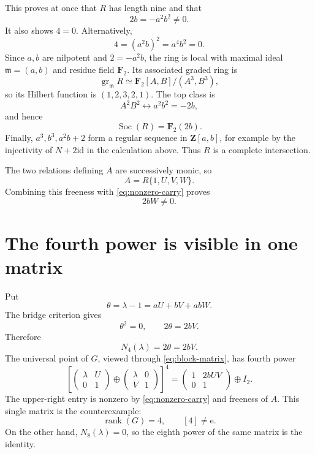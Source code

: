 \documentclass[11pt]{amsart}
\theoremstyle{definition}
\theoremstyle{remark}
\newcommand{\Z}{\mathbf Z}
\newcommand{\F}{\mathbf F}
\newcommand{\Soc}{\operatorname{Soc}}
\newcommand{\gr}{\operatorname{gr}}
\newcommand{\m}{\mathfrak m}
\newcommand{\id}{\mathrm{id}}
\newcommand{\unit}{\mathrm e}
\begin{document}
This proves at once that \(R\) has length nine and that
\begin{equation}\label{eq:nonzero-carry}
 2b=-a^2b^2\ne0.
\end{equation}
It also shows \(4=0\).  Alternatively,
\[
 4=(a^2b)^2=a^4b^2=0.
\]
Since \(a,b\) are nilpotent and \(2=-a^2b\), the ring is local with
maximal ideal \(\m=(a,b)\) and residue field \(\F_2\).  Its associated
graded ring is
\[
 \gr_{\m}R\simeq\F_2[A,B]/(A^3,B^3),
\]
so its Hilbert function is \((1,2,3,2,1)\).  The top class is
\[
 A^2B^2\longleftrightarrow a^2b^2=-2b,
\]
and hence
\[
 \Soc(R)=\F_2(2b).
\]
Finally, \(a^3,b^3,a^2b+2\) form a regular sequence in
\(\Z[a,b]\), for example by the injectivity of \(N+2\id\) in the
calculation above.  Thus \(R\) is a complete intersection.

The two relations defining \(A\) are successively monic, so
\[
 A=R\{1,U,V,W\}.
\]
Combining this freeness with \eqref{eq:nonzero-carry} proves
\[
 2bW\ne0.
\]

\section{The fourth power is visible in one matrix}
\label{sec:power}

Put
\[
 \theta=\lambda-1=aU+bV+abW.
\]
The bridge criterion gives
\begin{equation}\label{eq:theta}
 \theta^2=0,\qquad 2\theta=2bV.
\end{equation}
Therefore
\[
 N_4(\lambda)=2\theta=2bV.
\]
The universal point of \(G\), viewed through
\eqref{eq:block-matrix}, has fourth power
\begin{equation}\label{eq:matrix-fourth}
 \left[
 \begin{pmatrix}\lambda&U\\0&1\end{pmatrix}
 \oplus
 \begin{pmatrix}\lambda&0\\V&1\end{pmatrix}
 \right]^4
 =
 \begin{pmatrix}1&2bUV\\0&1\end{pmatrix}
 \oplus I_2.
\end{equation}
The upper-right entry is nonzero by
\eqref{eq:nonzero-carry} and freeness of \(A\).  This single matrix is
the counterexample:
\[
 \operatorname{rank}(G)=4,\qquad [4]\ne\unit.
\]
On the other hand, \(N_8(\lambda)=0\), so the eighth power of the same
matrix is the identity.
\end{document}

